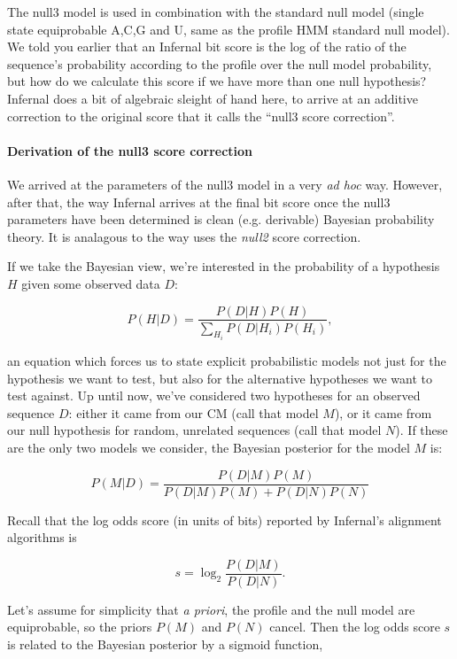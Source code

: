 \begin{sreoutput}
The null3 model is used in combination with the standard null model
(single state equiprobable A,C,G and U, same as the profile HMM
standard null model). We told you earlier that an Infernal bit score
is the log of the ratio of the sequence's probability according to the
profile over the null model probability, but how do we calculate this
score if we have more than one null hypothesis?  Infernal does a bit
of algebraic sleight of hand here, to arrive at an additive correction
to the original score that it calls the ``null3 score correction''.

\paragraph{Derivation of the null3 score correction}

We arrived at the parameters of the null3 model in a very \emph{ad
hoc} way. However, after that, the way Infernal arrives at the final bit
score once the null3 parameters have been determined is clean
(e.g. derivable) Bayesian probability theory. It is analagous to the
way  uses the \emph{null2} score correction.

If we take the Bayesian view, we're interested in the probability of a
hypothesis $H$ given some observed data $D$:

\[
   P(H | D) = \frac{P(D | H) P(H)}{\sum_{H_i} P(D | H_i) P(H_i)},
\]

an equation which forces us to state explicit probabilistic models not
just for the hypothesis we want to test, but also for the alternative
hypotheses we want to test against. Up until now, we've considered two
hypotheses for an observed sequence $D$: either it came from our
CM (call that model $M$), or it came from our null hypothesis
for random, unrelated sequences (call that model $N$). If these are
the only two models we consider, the Bayesian posterior for the model
$M$ is:

\[
   P(M | D) = \frac{P(D | M) P(M)}{P(D | M) P(M) + P(D | N) P(N)}
\]

Recall that the log odds score (in units of bits) reported by
Infernal's alignment algorithms is

\[
  s = \log_2 \frac{P(D | M)}{P(D | N)}.
\]

Let's assume for simplicity that \emph{a priori}, the profile and the
null model are equiprobable, so the priors $P(M)$ and $P(N)$
cancel. Then the log odds score $s$ is related to the Bayesian
posterior by a sigmoid function,


\end{sreoutput}
